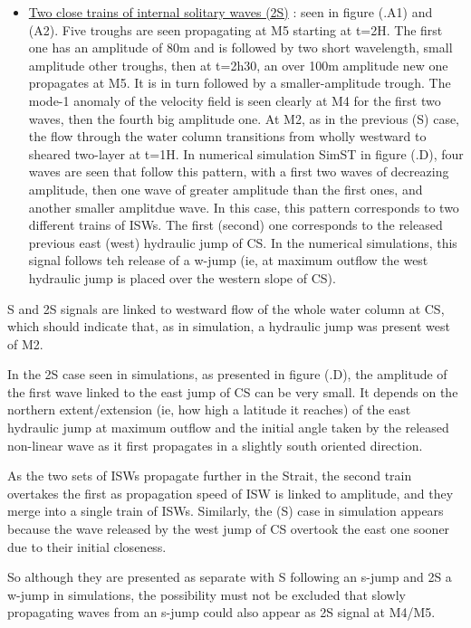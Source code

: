 \begin{itemize}
%
\item \underline{Two close trains of internal solitary waves (2S)} : seen in figure (.A1) and (A2). Five troughs are seen propagating at M5 starting at t=2H. The first one has an amplitude of 80m and is followed by two short wavelength, small amplitude other troughs, then at t=2h30, an over 100m amplitude new one propagates at M5. It is in turn followed by a smaller-amplitude trough. The mode-1 anomaly of the velocity field is seen clearly at M4 for the first two waves, then the fourth big amplitude one. At M2, as in the previous (S) case, the flow through the water column transitions from wholly westward to sheared two-layer at t=1H. In numerical simulation SimST in figure (.D), four waves are seen that follow this pattern, with a first two waves of decreazing amplitude, then one wave of greater amplitude than the first ones, and another smaller amplitdue wave. In this case, this pattern corresponds to two different trains of ISWs. The first (second) one corresponds to the released previous east (west) hydraulic jump of CS. In the numerical simulations, this signal follows teh release of a w-jump (ie, at maximum outflow the west hydraulic jump is placed over the western slope of CS).
\end{itemize}

S and 2S signals are linked to westward flow of the whole water column at CS, which should indicate that, as in simulation, a hydraulic jump was present west of M2.

In the 2S case seen in simulations, as presented in figure (.D), the amplitude of the first wave linked to the east jump of CS can be very small. It depends on the northern extent/extension (ie, how high a latitude it reaches) of the east hydraulic jump at maximum outflow and the initial angle taken by the released non-linear wave as it first propagates in a slightly south oriented direction.

As the two sets of ISWs propagate further in the Strait, the second train overtakes the first as propagation speed of ISW is linked to amplitude, and they merge into a single train of ISWs. Similarly, the (S) case in simulation appears because the wave released by the west jump of CS overtook the east one sooner due to their initial closeness.

So although they are presented as separate with S following an s-jump and 2S a w-jump in simulations, the possibility must not be excluded that slowly propagating waves from an s-jump could also appear as 2S signal at M4/M5.


